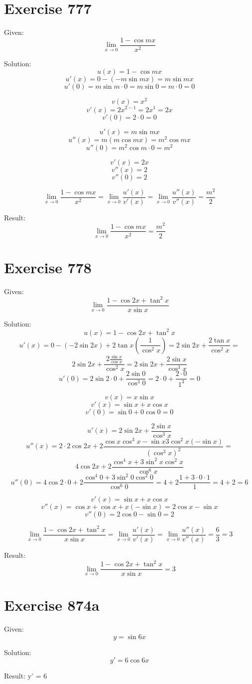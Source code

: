 \documentclass[a4paper, 10pt]{scrartcl}
\begin{document}
\section{Exercise 777}

Given:
\[
\lim_{x\to 0}{\frac{1 - \cos{mx}}{x^{2}}}
\]

Solution:
\[
u(x) = 1 - \cos{mx}
\]
\[
u'(x) = 0 - (-m\sin{mx}) = m\sin{mx}
\]
\[
u'(0) = m\sin{m\cdot 0} = m\sin{0} = m\cdot 0 = 0
\]

\[
v(x) = x^{2}
\]
\[
v'(x) = 2x^{2 - 1} = 2x^{1} = 2x
\]
\[
v'(0) = 2\cdot 0 = 0
\]

\[
u'(x) = m\sin{mx}
\]
\[
u''(x) = m(m\cos{mx}) = m^{2}\cos{mx}
\]
\[
u''(0) = m^{2}\cos{m\cdot 0} = m^{2}
\]

\[
v'(x) = 2x
\]
\[
v''(x) = 2
\]
\[
v''(0) = 2
\]

\[
\lim_{x\to 0}{\frac{1 - \cos{mx}}{x^{2}}} = \lim_{x\to 0}{\frac{u'(x)}{v'(x)}} = \lim_{x\to 0}{\frac{u''(x)}{v''(x)}}
= \frac{m^{2}}{2}
\]

Result:
\[
\lim_{x\to 0}{\frac{1 - \cos{mx}}{x^{2}}} = \frac{m^{2}}{2}
\]

\section{Exercise 778}

Given:
\[
\lim_{x\to 0}{\frac{1 - \cos{2x} + \tan^{2}{x}}{x\sin{x}}}
\]

Solution:
\[
u(x) = 1 - \cos{2x} + \tan^{2}{x}
\]
\[
u'(x) = 0 - (-2\sin{2x}) + 2\tan{x}(\frac{1}{\cos^{2}{x}}) = 2\sin{2x} + \frac{2\tan{x}}{\cos^{2}{x}} =
\]
\[
2\sin{2x} + \frac{2\frac{\sin{x}}{\cos{x}}}{\cos^{2}{x}} = 2\sin{2x} + \frac{2\sin{x}}{\cos^{3}{x}}
\]
\[
u'(0) = 2\sin{2\cdot 0} + \frac{2\sin{0}}{\cos^{3}{0}} = 2\cdot 0 + \frac{2\cdot 0}{1^{3}} = 0
\]

\[
v(x) = x\sin{x}
\]
\[
v'(x) = \sin{x} + x\cos{x}
\]
\[
v'(0) = \sin{0} + 0\cos{0} = 0
\]

\[
u'(x) = 2\sin{2x} + \frac{2\sin{x}}{\cos^{3}{x}}
\]
\[
u''(x) = 2\cdot 2\cos{2x} + 2\frac{\cos{x}\cos^{3}{x} - \sin{x}3\cos^{2}{x}(-\sin{x})}{(\cos^{3}{x})^{2}} =
\]
\[
4\cos{2x} + 2\frac{\cos^{4}{x} + 3\sin^{2}{x}\cos^{2}{x}}{\cos^{6}{x}}
\]
\[
u''(0) = 4\cos{2\cdot 0} + 2\frac{\cos^{4}{0} + 3\sin^{2}{0}\cos^{2}{0}}{\cos^{6}{0}} = 4 + 2\frac{1 + 3\cdot 0\cdot 1}{1} = 4 + 2 = 6
\]

\[
v'(x) = \sin{x} + x\cos{x}
\]
\[
v''(x) = \cos{x} + \cos{x} + x(-\sin{x}) = 2\cos{x} - \sin{x}
\]
\[
v''(0) = 2\cos{0} - \sin{0} = 2
\]

\[
\lim_{x\to 0}{\frac{1 - \cos{2x} + \tan^{2}{x}}{x\sin{x}}} = \lim_{x\to 0}{\frac{u'(x)}{v'(x)}} = \lim_{x\to 0}{\frac{u''(x)}{v''(x)}} =
\frac{6}{3} = 3
\]

Result:
\[
\lim_{x\to 0}{\frac{1 - \cos{2x} + \tan^{2}{x}}{x\sin{x}}} = 3
\]

\section{Exercise 874a}

Given:
\[
y = \sin{6x}
\]

Solution:
\[
y' = 6\cos{6x}
\]

Result:
y' = 6
\end{document}
